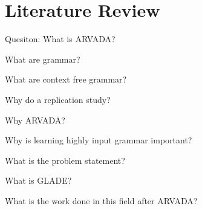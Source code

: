 \chapter{Literature Review}

Quesiton:
What is ARVADA?

What are grammar?

What are context free grammar?

Why do a replication study?

Why ARVADA?

Why is learning highly input grammar important?

What is the problem statement?

What is GLADE?

What is the work done in this field after ARVADA?


